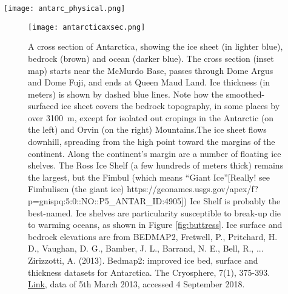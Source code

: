 \begin{sidewaysfigure}[htp]
	\centering
  \texttt{[image: antarc\_physical.png]}%
	\caption{Antarctica and its perennial ice. Panel A (left) shows the physical features of the continent, with ice in white, exposed rock in brown, floating ice shelves in light blue, and principle bases marked by red squares. Note that the East and West Antarctic Ice Sheets are largely separated by the Transantarctic Mountains, while the ice sheet of the Antarctic Peninsula sticks off to the northeast. Figure is courtesy of Wikipedia, (https://en.wikipedia.org/wiki/Geography\_of\_Antarctica\#/media/File:Antarctica.svg) accessed 7 September 2018. Panel B shows the ice sheet's motion, with speeds indicated by the color scale in the upper left. Black lines indicate flow divides; places where ice flows in opposite directions. Note how the ice sheets drain through outlet glaciers (in reds and purples) to the peripheral floating ice shelves. The red (Panel A) and white (Panel B) show the cross section line in Figure \ref{fig:AISXC}. Panel B is courtesy of NASA's Goddard Space Flight Center Scientific Visualization Studio, https://svs.gsfc.nasa.gov/3849, accessed 7 September 2018. }  
	\label{fig:antarc_map}
\end{sidewaysfigure}


\begin{figure}[p]
	\centering
  \texttt{[image: antarcticaxsec.png]}%
	\caption{A cross section of Antarctica, showing the ice sheet (in lighter blue), bedrock (brown) and ocean (darker blue). The cross section (inset map) starts near the McMurdo Base, passes through Dome Argus and Dome Fuji, and ends at Queen Maud Land. Ice thickness (in meters) is shown by dashed blue lines. Note how the smoothed-surfaced ice sheet covers the bedrock topography, in some places by over \SI{3100}{\metre}, except for isolated out cropings in the Antarctic (on the left) and Orvin (on the right) Mountains.The ice sheet flows downhill, spreading from the high point toward the margins of the continent. Along the continent's margin are a number of floating ice shelves. The Ross Ice Shelf (a few hundreds of meters thick) remains the largest, but the Fimbul (which means ``Giant Ice''[Really! see Fimbulisen (the giant ice) https://geonames.usgs.gov/apex/f?p=gnispq:5:0::NO::P5\_ANTAR\_ID:4905]) Ice Shelf is probably the best-named. Ice shelves are particularity susceptible to break-up die to warming oceans, as shown in Figure \ref{fig:buttress}. Ice surface and bedrock elevations are from BEDMAP2, Fretwell, P., Pritchard, H. D., Vaughan, D. G., Bamber, J. L., Barrand, N. E., Bell, R., ... Zirizzotti, A. (2013). Bedmap2: improved ice bed, surface and thickness datasets for Antarctica. The Cryosphere, 7(1), 375-393. \href{https://doi.org/10.5194/tc-7-375-2013}{Link}, data of 5th March 2013, accessed 4 September 2018.}  
	\label{fig:AISXC}
\end{figure}


